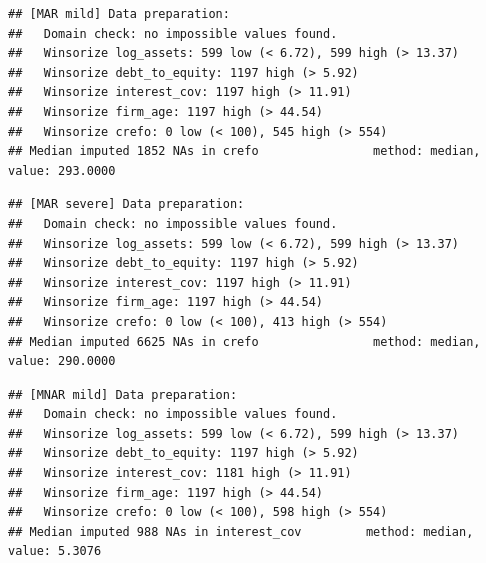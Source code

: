\documentclass[
]{article}
\newenvironment{Shaded}{\begin{snugshade}}{\end{snugshade}}
\newcommand{\AttributeTok}[1]{\textcolor[rgb]{0.13,0.29,0.53}{#1}}
\newcommand{\FunctionTok}[1]{\textcolor[rgb]{0.13,0.29,0.53}{\textbf{#1}}}
\newcommand{\NormalTok}[1]{#1}
\newcommand{\OtherTok}[1]{\textcolor[rgb]{0.56,0.35,0.01}{#1}}
\newcommand{\SpecialCharTok}[1]{\textcolor[rgb]{0.81,0.36,0.00}{\textbf{#1}}}
\newcommand{\StringTok}[1]{\textcolor[rgb]{0.31,0.60,0.02}{#1}}
\begin{document}
\begin{verbatim}
## [MAR mild] Data preparation:
##   Domain check: no impossible values found.
##   Winsorize log_assets: 599 low (< 6.72), 599 high (> 13.37)
##   Winsorize debt_to_equity: 1197 high (> 5.92)
##   Winsorize interest_cov: 1197 high (> 11.91)
##   Winsorize firm_age: 1197 high (> 44.54)
##   Winsorize crefo: 0 low (< 100), 545 high (> 554)
## Median imputed 1852 NAs in crefo                method: median, value: 293.0000
\end{verbatim}

\begin{Shaded}
\end{Shaded}

\begin{verbatim}
## [MAR severe] Data preparation:
##   Domain check: no impossible values found.
##   Winsorize log_assets: 599 low (< 6.72), 599 high (> 13.37)
##   Winsorize debt_to_equity: 1197 high (> 5.92)
##   Winsorize interest_cov: 1197 high (> 11.91)
##   Winsorize firm_age: 1197 high (> 44.54)
##   Winsorize crefo: 0 low (< 100), 413 high (> 554)
## Median imputed 6625 NAs in crefo                method: median, value: 290.0000
\end{verbatim}

\begin{Shaded}
\end{Shaded}

\begin{verbatim}
## [MNAR mild] Data preparation:
##   Domain check: no impossible values found.
##   Winsorize log_assets: 599 low (< 6.72), 599 high (> 13.37)
##   Winsorize debt_to_equity: 1197 high (> 5.92)
##   Winsorize interest_cov: 1181 high (> 11.91)
##   Winsorize firm_age: 1197 high (> 44.54)
##   Winsorize crefo: 0 low (< 100), 598 high (> 554)
## Median imputed 988 NAs in interest_cov         method: median, value: 5.3076
\end{verbatim}
\end{document}
